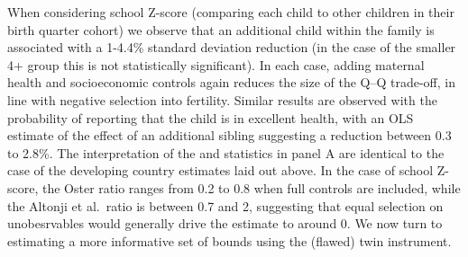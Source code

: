 \documentclass[subeqn]{article}
\begin{document}
\begin{spacing}{1.4}
When considering school Z-score (comparing each child to other children in their
birth quarter cohort) we observe that an additional child within the family is
associated with a 1-4.4\% standard deviation reduction (in the case of the
smaller 4+ group this is not statistically significant).  In each case, adding
maternal health and socioeconomic controls again reduces the size of the Q--Q
trade-off, in line with negative selection into fertility.  Similar results are
observed with the probability of reporting that the child is in excellent
health, with an OLS estimate of the effect of an additional sibling suggesting
a reduction between 0.3 to 2.8\%.  The interpretation of the
\citeauthor{Altonjietal2005} and \citeauthor{Oster2013} statistics in panel A
are identical to the case of the developing country estimates laid out above.
In the case of school Z-score, the Oster ratio ranges from 0.2 to 0.8 when full
controls are included, while the Altonji et al.\ ratio is between 0.7 and 2,
suggesting that equal selection on unobesrvables would generally drive the
estimate to around 0.  We now turn to estimating a more informative set of
bounds using the (flawed) twin instrument.


\end{spacing}
\end{document}
